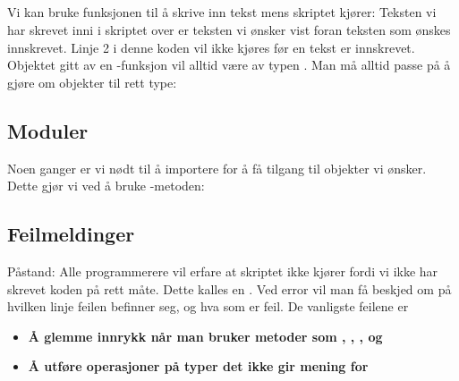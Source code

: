 \subsection{}
Vi kan bruke funksjonen  til å skrive inn tekst mens skriptet kjører:
Teksten vi har skrevet inni  i skriptet over er teksten vi ønsker vist foran teksten som ønskes innskrevet. Linje 2 i denne koden vil ikke kjøres før en tekst er innskrevet.
\newpage
Objektet gitt av en -funksjon vil alltid være av typen . Man må alltid passe på å gjøre om objekter til rett type:
\subsection{Moduler}
Noen ganger er vi nødt til å importere  for å få tilgang til objekter vi ønsker. Dette gjør vi ved å bruke -metoden:

\newpage
\subsection{Feilmeldinger}
Påstand: Alle programmerere vil erfare at skriptet ikke kjører fordi vi ikke har skrevet koden på rett måte. Dette kalles en . Ved error vil man få beskjed om på hvilken linje feilen befinner seg, og hva som er feil. De vanligste feilene er
\begin{itemize}
\item \textbf{Å glemme innrykk når man bruker metoder som , , , og  }
\newpage
\item \textbf{Å utføre operasjoner på typer det ikke gir mening for}
\end{itemize}

